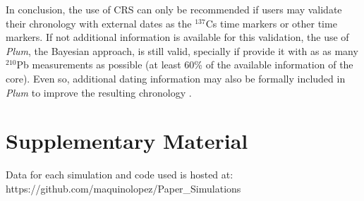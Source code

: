 \documentclass [10pt] {article}
\begin{document}
In conclusion, the use of CRS can only be recommended if users may validate their chronology with external dates as the $^{137}$Cs time markers or other time markers. If not additional information is available for this validation, the use of \textit{Plum}, the Bayesian approach, is still valid, specially if provide it with as as many $^{210}$Pb measurements as possible (at least 60\% of the available information of the core).  Even so, additional dating information may also be formally included in \textit{Plum} to improve the resulting chronology \citep{Aquino2018,Aquino2020}. 




\newpage




\section{Supplementary Material}
\label{sec:supp_mat}
Data for each simulation and code used is hosted at: https://github.com/maquinolopez/Paper\_Simulations
\newpage
\end{document}
